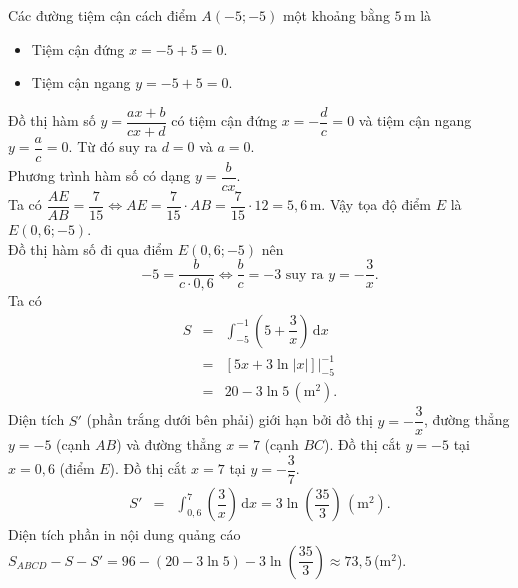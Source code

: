 \begin{bt}
{		Các  đường tiệm cận cách điểm $A(-5;-5)$ một khoảng bằng $5$\,m là
		\begin{itemize}
			\item Tiệm cận đứng $x = -5 + 5 = 0$. 
			\item Tiệm cận ngang $y  = -5 + 5 = 0$.
		\end{itemize}
		Đồ  thị hàm số $y=\dfrac{ax+b}{cx+d}$ có tiệm cận đứng $x=-\dfrac{d}{c}=0$ và tiệm cận ngang $y=\dfrac{a}{c}=0$.
		Từ  đó suy ra $d=0$ và $a=0$.\\ Phương trình hàm số có dạng $y=\dfrac{b}{cx}$. \\
		Ta có  $\dfrac{AE}{AB}=\dfrac{7}{15} \Leftrightarrow AE=\dfrac{7}{15} \cdot AB = \dfrac{7}{15} \cdot 12 = 5{,}6$\,m. Vậy tọa độ điểm $E$ là $E(0{,}6;-5)$.\\
		Đồ thị hàm số đi qua điểm  $E(0{,}6;-5)$ nên
		$$-5 = \dfrac{b}{c\cdot 0{,}6} \Leftrightarrow \dfrac{b}{c} =-3 \text{ suy ra  } y=-\dfrac{3}{x}.$$
		Ta có 
		\begin{eqnarray*}
			S& = & \displaystyle\int_{-5}^{-1}\left(5+\dfrac{3}{x}\right)\mathrm{\,d}x\\ 
			& = &\left[5x  + 3\ln|x|\right]\Big|_{-5}^{-1}\\
			& = & 20  - 3\ln 5\,\left(\text{m}^2\right).
		\end{eqnarray*}
		Diện tích $S'$ (phần trắng dưới bên phải) giới hạn bởi đồ thị $y=-\dfrac{3}{x}$, đường thẳng $y=-5$ (cạnh $AB$) và đường thẳng $x=7$ (cạnh $BC$). Đồ thị cắt $y=-5$ tại $x=0{,}6$ (điểm $E$). Đồ thị cắt $x=7$  tại $y=-\dfrac{3}{7}$.
		\begin{eqnarray*}
			S'&=&\displaystyle\int_{0{,}6}^{7}\left(\dfrac{3}{x}\right)\mathrm{\,d}x  = 3\ln\left(\dfrac{35}{3}\right)\,\left(\text{m}^2\right).
		\end{eqnarray*}
		Diện tích phần in nội dung quảng cáo $S_{ABCD} - S - S' = 96 - (20 - 3\ln5) - 3\ln\left(\dfrac{35}{3}\right)\approx 73{,}5$\,(m$^2$). 
	 }
\end{bt}

